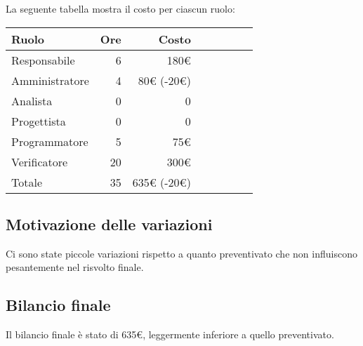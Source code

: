 La seguente tabella mostra il costo per ciascun ruolo:
\begin{table}[ht]
    \begin{tabularx}{\linewidth}{X|rrrrrrr}
    \rowcolor{gray!30}Ruolo & Ore & Costo \\
    \hline
    Responsabile                            & 6    & 180€\\
    \rowcolor{gray!10}Amministratore        & 4    & 80€ (-20€)  \\
    Analista                                & 0    & 0\\
    \rowcolor{gray!10}Progettista           & 0    & 0\\
    Programmatore                           & 5    & 75€ \\
    \rowcolor{gray!10}Verificatore          & 20   & 300€ \\
    \hline Totale                           & 35   & 635€ (-20€)\\ 
    \end{tabularx}
\end{table}

\subsection{Motivazione delle variazioni}
Ci sono state piccole variazioni rispetto a quanto preventivato che non influiscono pesantemente nel risvolto finale.

\subsection{Bilancio finale}
Il bilancio finale è stato di 635€, leggermente inferiore a quello preventivato.
